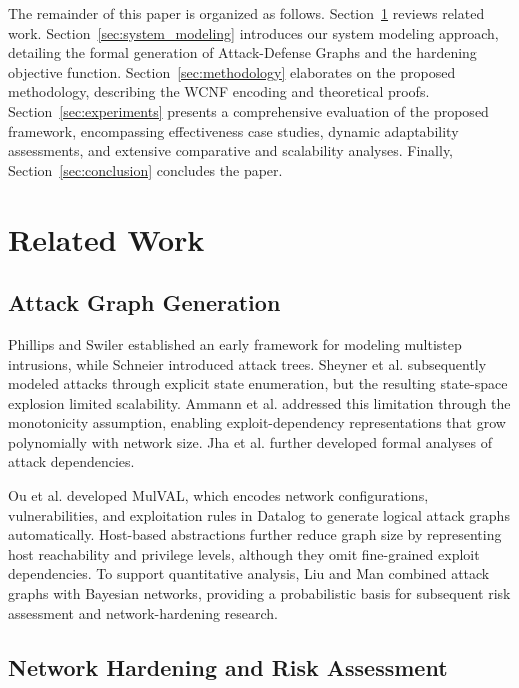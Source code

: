 \documentclass[conference]{IEEEtran}
\theoremstyle{definition} %
\theoremstyle{plain} %
\begin{document}
The remainder of this paper is organized as follows. Section~\ref{Related Work} reviews related work. Section~\ref{sec:system_modeling} introduces our system modeling approach, detailing the formal generation of Attack-Defense Graphs and the hardening objective function. Section~\ref{sec:methodology} elaborates on the proposed methodology, describing the WCNF encoding and theoretical proofs.  Section~\ref{sec:experiments} presents a comprehensive evaluation of the proposed framework, encompassing effectiveness case studies, dynamic adaptability assessments, and extensive comparative and scalability analyses. Finally, Section~\ref{sec:conclusion} concludes the paper.

{\color{red}
\section{Related Work}\label{Related Work}

\subsection{Attack Graph Generation}

Phillips and Swiler \cite{phillips1998graph} established an early framework for modeling multistep intrusions, while Schneier \cite{schneier1999attack} introduced attack trees. Sheyner et al. \cite{sheyner2002automated} subsequently modeled attacks through explicit state enumeration, but the resulting state-space explosion limited scalability. Ammann et al. \cite{10.1145/586110.586140} addressed this limitation through the monotonicity assumption, enabling exploit-dependency representations that grow polynomially with network size. Jha et al. \cite{jha2002two} further developed formal analyses of attack dependencies.

Ou et al. \cite{ou2005mulval,ou2006scalable} developed MulVAL, which encodes network configurations, vulnerabilities, and exploitation rules in Datalog \cite{ceri1989you} to generate logical attack graphs automatically. Host-based abstractions \cite{ammann2005host,ingols2006practical} further reduce graph size by representing host reachability and privilege levels, although they omit fine-grained exploit dependencies. To support quantitative analysis, Liu and Man \cite{liu2005network} combined attack graphs with Bayesian networks, providing a probabilistic basis for subsequent risk assessment and network-hardening research.

\subsection{Network Hardening and Risk Assessment}

}
\end{document}
